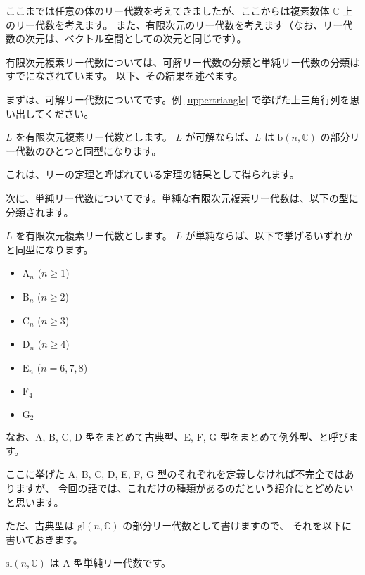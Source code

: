 \documentclass{ltjsarticle}
\begin{document}
ここまでは任意の体のリー代数を考えてきましたが、ここからは複素数体 $\mathbb{C}$ 上のリー代数を考えます。
また、有限次元のリー代数を考えます（なお、リー代数の次元は、ベクトル空間としての次元と同じです）。

有限次元複素リー代数については、可解リー代数の分類と単純リー代数の分類はすでになされています。
以下、その結果を述べます。

まずは、可解リー代数についてです。例 \ref{uppertriangle} で挙げた上三角行列を思い出してください。

\begin{theorem}[可解リー代数の分類]
    $L$ を有限次元複素リー代数とします。
    $L$ が可解ならば、$L$ は $\mathrm{b}(n,\mathbb{C})$ の部分リー代数のひとつと同型になります。
\end{theorem}

これは、リーの定理と呼ばれている定理の結果として得られます。

次に、単純リー代数についてです。単純な有限次元複素リー代数は、以下の型に分類されます。

\begin{theorem}[単純リー代数の分類]
    $L$ を有限次元複素リー代数とします。
    $L$ が単純ならば、以下で挙げるいずれかと同型になります。
    \begin{itemize}
        \item $\mathrm{A}_n$ ($n \geq 1$)
        \item $\mathrm{B}_n$ ($n \geq 2$)
        \item $\mathrm{C}_n$ ($n \geq 3$)
        \item $\mathrm{D}_n$ ($n \geq 4$)
        \item $\mathrm{E}_n$ ($n = 6,7,8$)
        \item $\mathrm{F}_4$
        \item $\mathrm{G}_2$
    \end{itemize}
    なお、A, B, C, D 型をまとめて古典型、E, F, G 型をまとめて例外型、と呼びます。
\end{theorem}

ここに挙げた A, B, C, D, E, F, G 型のそれぞれを定義しなければ不完全ではありますが、
今回の話では、これだけの種類があるのだという紹介にとどめたいと思います。

ただ、古典型は $\mathrm{gl}(n,\mathbb{C})$ の部分リー代数として書けますので、
それを以下に書いておきます。

\begin{example}[A型単純リー代数]
    $\mathrm{sl}(n,\mathbb{C})$ は A 型単純リー代数です。
\end{example}
\end{document}
